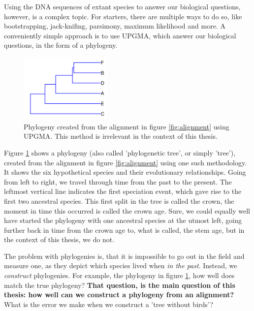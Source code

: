 Using the DNA sequences of extant species to answer our biological questions,
however, is a complex topic. For starters, there are multiple 
ways to do so, like bootstrapping, 
jack-knifing, parsimony, maximum likelihood and more.
A conveniently simple approach is to use UPGMA, which answer our biological
questions, in the form of a phylogeny.


\begin{figure}[H]
  \includegraphics[width=0.4\textwidth]{phylogeny_40_upgma.png}
  \caption{
    Phylogeny created from the alignment in figure \ref{fig:alignment} 
    using UPGMA. 
    This method is irrelevant in the context of this thesis.
  }
  \label{fig:phylogeny_upgma}
\end{figure}

Figure \ref{fig:phylogeny_upgma} shows a phylogeny (also called 'phylogenetic tree', 
or simply 'tree'), created from the alignment 
in figure \ref{fig:alignment} using one such methodology.
It shows the six hypothetical species and their evolutionary 
relationships. Going from left to right, we travel through time from 
the past to the present. 
The leftmost vertical line indicates the first speciation event, 
which gave rise to the first two ancestral species. 
This first split in the tree is called the crown,
the moment in time this occurred is called the crown age.
Sure, we could equally well have started the phylogeny 
with one ancestral species at the utmost left,
going further back in time from the crown age to, what is called, the stem age,
but in the context of this thesis, we do not.

The problem with phylogenies is, 
that it is impossible to go out in the field and measure one, 
as they depict which species lived when \emph{in the past}.
Instead, we \emph{construct} phylogenies. For example,
the phylogeny in figure \ref{fig:phylogeny_upgma}, how well
does match the true phylogeny? \textbf{That question, is the main question of this 
thesis: how well can we construct a
phylogeny from an alignment?} What is the error we
make when we construct a 'tree without birds'?

